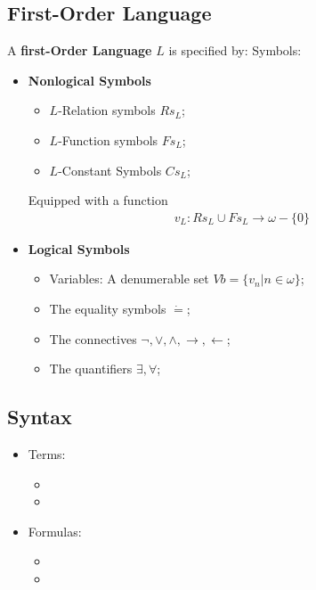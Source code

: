 \documentclass[Total.tex]{subfiles}
\begin{document}
			\subsection{First-Order Language}
				\begin{Def}
					A \textbf{first-Order Language} $L$ is specified by: Symbols:
					\begin{itemize}
						\item \textbf{Nonlogical Symbols}
						\begin{itemize}
							\item $L$-Relation symbols $Rs_L$;
							\item $L$-Function symbols $Fs_L$;
							\item $L$-Constant Symbols $Cs_L$;
						\end{itemize}
						
						Equipped with a function
						\begin{gather*}
							v_L:Rs_L\cup Fs_L\rightarrow \omega- \{0\}
						\end{gather*}
						\item \textbf{Logical Symbols}
						\begin{itemize}
							\item Variables: A denumerable set $Vb=\{v_n|n\in \omega\}$;
							\item The equality symbols $\dot{=}$;
							\item The connectives $\neg,\vee,\wedge,\rightarrow,\leftarrow$;
							\item The quantifiers $\exists,\forall$;
						\end{itemize}
					\end{itemize}
				\end{Def}
				
				\subsection{Syntax}
				\begin{Def}
					\begin{itemize}
						\item Terms:
						\begin{itemize}
							\item 
							\item 
						\end{itemize}
						\item Formulas:
						\begin{itemize}
							\item 
							\item 
						\end{itemize}
					\end{itemize}
				\end{Def}
				
\end{document}
